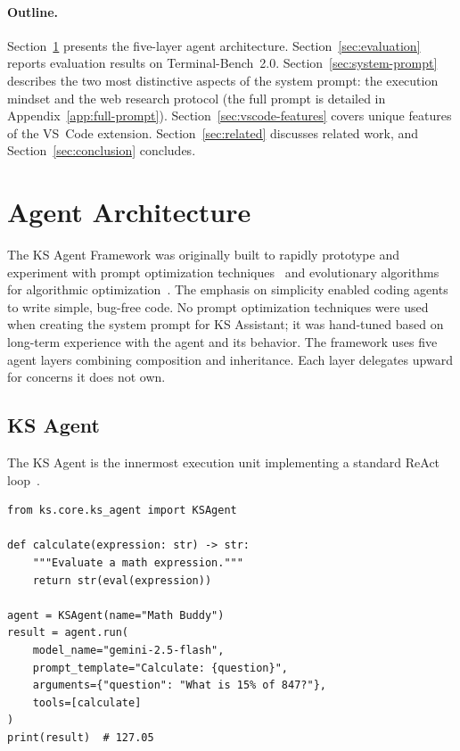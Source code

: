 \documentclass{article}
\begin{document}
\paragraph{Outline.}
Section~\ref{sec:architecture} presents the five-layer agent architecture.  Section~\ref{sec:evaluation} reports evaluation results on Terminal-Bench~2.0.  Section~\ref{sec:system-prompt} describes the two most distinctive aspects of the system prompt: the execution mindset and the web research protocol (the full prompt is detailed in Appendix~\ref{app:full-prompt}).  Section~\ref{sec:vscode-features} covers unique features of the VS~Code extension.  Section~\ref{sec:related} discusses related work, and Section~\ref{sec:conclusion} concludes.

\section{Agent Architecture}
\label{sec:architecture}

The KS Agent Framework was originally built to rapidly prototype and experiment with prompt optimization techniques~\citep{agrawal2025gepa} and evolutionary algorithms for algorithmic optimization~\citep{novikov2025alphaevolve,openevolve2025}.  The emphasis on simplicity enabled coding agents to write simple, bug-free code.  No prompt optimization techniques were used when creating the system prompt for KS Assistant; it was hand-tuned based on long-term experience with the agent and its behavior.  The framework uses five agent layers combining composition and inheritance.  Each layer delegates upward for concerns it does not own.

\subsection{KS Agent}
\label{sec:ks-agent}

The KS Agent is the innermost execution unit implementing a standard ReAct loop~\citep{yao2023react}.

\begin{lstlisting}[style=kisspy,numbers=none,caption={A complete KS agent with a single tool.},label={lst:simple-agent}]
from ks.core.ks_agent import KSAgent

def calculate(expression: str) -> str:
    """Evaluate a math expression."""
    return str(eval(expression))

agent = KSAgent(name="Math Buddy")
result = agent.run(
    model_name="gemini-2.5-flash",
    prompt_template="Calculate: {question}",
    arguments={"question": "What is 15% of 847?"},
    tools=[calculate]
)
print(result)  # 127.05
\end{lstlisting}
\end{document}
